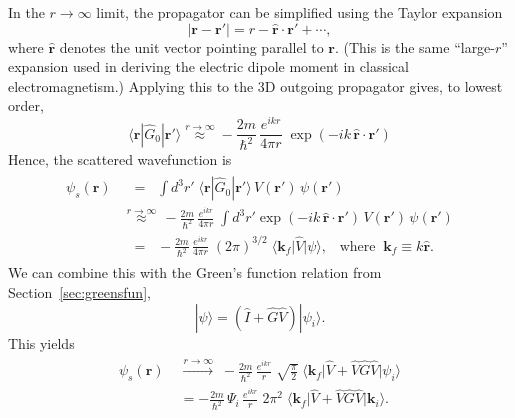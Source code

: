\documentclass[pra,12pt]{revtex4}
\begin{document}
In the $r\rightarrow\infty$ limit, the propagator can be simplified
using the Taylor expansion
\begin{equation}
  |\mathbf{r} - \mathbf{r}'| = r - \hat{\mathbf{r}} \cdot \mathbf{r}' + \cdots,
\end{equation}
where $\hat{\mathbf{r}}$ denotes the unit vector pointing parallel to
$\mathbf{r}$.  (This is the same ``large-$r$'' expansion used in
deriving the electric dipole moment in classical electromagnetism.)
Applying this to the 3D outgoing propagator gives, to lowest order,
\begin{equation}
  \langle\mathbf{r}|\hat{G}_0|\mathbf{r}'\rangle \overset{r\rightarrow\infty}{\approx} - \frac{2m}{\hbar^2}\, \frac{e^{ikr}}{4\pi r}\; \exp\left(-ik \, \hat{\mathbf{r}} \cdot \mathbf{r}'\right)
\end{equation}
Hence, the scattered wavefunction is
\begin{align}
  \begin{aligned}\psi_s(\mathbf{r}) &\;\;= \;\; \int d^3r'\; \langle\mathbf{r}|\hat{G}_0|\mathbf{r}'\rangle\, V(\mathbf{r}')\, \psi(\mathbf{r}') \\ &\overset{r\rightarrow\infty}{\approx} \, - \frac{2m}{\hbar^2} \, \frac{e^{ikr}}{4\pi r}\; \int d^3r' \exp\left(-ik \, \hat{\mathbf{r}} \cdot \mathbf{r}'\right)\, V(\mathbf{r}')\, \psi(\mathbf{r}') \\ &\;\;=\;\; - \frac{2m}{\hbar^2} \, \frac{e^{ikr}}{4\pi r} \; (2\pi)^{3/2} \; \big\langle \mathbf{k}_f \big|\hat{V}\big|\psi\big\rangle, \;\;\;\mathrm{where}\;\; \mathbf{k}_f \equiv k \hat{\mathbf{r}}. \end{aligned}
\end{align}
We can combine this with the Green's function relation from
Section~\ref{sec:greensfun},
\begin{equation}
  |\psi\rangle = \left(\hat{I} + \hat{G}\hat{V}\right)|\psi_i\rangle.
\end{equation}
This yields
\begin{align}
  \begin{aligned}\psi_s(\mathbf{r}) \; &\overset{r\rightarrow\infty}{\longrightarrow} \; - \frac{2m}{\hbar^2} \, \frac{e^{ikr}}{r} \; \sqrt{\frac{\pi}{2}} \; \big\langle \mathbf{k}_f \big|\hat{V} + \hat{V}\hat{G}\hat{V}\big|\psi_i\big\rangle \\ &= - \frac{2m}{\hbar^2} \, \Psi_i\, \frac{e^{ikr}}{r} \; 2\pi^2 \; \big\langle \mathbf{k}_f \big|\hat{V} + \hat{V}\hat{G}\hat{V}\big|\mathbf{k}_i\big\rangle.\end{aligned}
\end{align}
\end{document}
